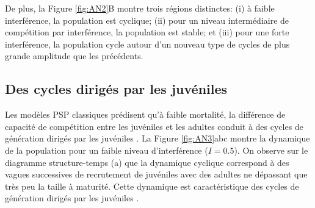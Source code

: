 De plus, la Figure \ref{fig:AN2}B montre trois régions distinctes: (i) à faible
interférence, la population est cyclique; (ii) pour un niveau intermédiaire de
compétition par interférence, la population est stable; et (iii) pour une forte
interférence, la population cycle autour d'un nouveau type de cycles de plus
grande amplitude que les précédents. 

\subsection{Des cycles dirigés par les juvéniles}

Les modèles PSP classiques prédisent qu'à faible mortalité, la différence de
capacité de compétition entre les juvéniles et les adultes conduit à des cycles
de génération dirigés par les juvéniles \autocites{de-roos1992a,de-roos1997a}.
La Figure \ref{fig:AN3}abc montre la dynamique de la population pour un faible
niveau d'interférence ($I=0.5$). On observe sur le diagramme structure-temps (a)
que la dynamique cyclique correspond à des vagues successives de recrutement de
juvéniles avec des adultes ne dépassant que très peu la taille à maturité. Cette
dynamique est caractéristique des cycles de génération dirigés par les juvéniles
\autocites{de-roos1992a,de-roos2003a}.

